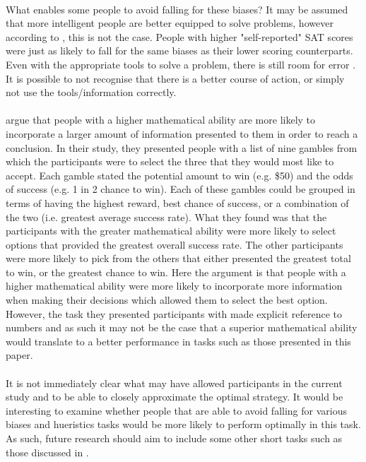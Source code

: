 \documentclass[12pt]{article}
\begin{document}
\paragraph{} What enables some people to avoid falling for these biases? It may be assumed that more intelligent people are better equipped to solve problems, however according to \cite{stanovich2008relative}, this is not the case. People with higher "self-reported" SAT scores were just as likely to fall for the same biases as their lower scoring counterparts. Even with the appropriate tools to solve a problem, there is still room for error \citep{KAHNEMAN1982}. It is possible to not recognise that there is a better course of action, or simply not use the tools/information correctly.  

\paragraph{} \cite{jasper2017numeracy} argue that people with a higher mathematical ability are more likely to incorporate a larger amount of information presented to them in order to reach a conclusion. In their study, they presented people with a list of nine gambles from which the participants were to select the three that they would most like to accept. Each gamble stated the potential amount to win (e.g. \$50) and the odds of success (e.g. 1 in 2 chance to win). Each of these gambles could be grouped in terms of having the highest reward, best chance of success, or a combination of the two (i.e. greatest average success rate). What they found was that the participants with the greater mathematical ability were more likely to select options that provided the greatest overall success rate. The other participants were more likely to pick from the others that either presented the greatest total to win, or the greatest chance to win. Here the argument is that people with a higher mathematical ability were more likely to incorporate more information when making their decisions which allowed them to select the best option. However, the task they presented participants with made explicit reference to numbers and as such it may not be the case that a superior mathematical ability would translate to a better performance in tasks such as those presented in this paper. 

\paragraph{} It is not immediately clear what may have allowed participants in the current study and \cite{clarke2015failure} to be able to closely approximate the optimal strategy. It would be interesting to examine whether people that are able to avoid falling for various biases and hueristics tasks would be more likely to perform optimally in this task. As such, future research should aim to include some other short tasks such as those discussed in \cite{Toplak2011}. 
\end{document}
